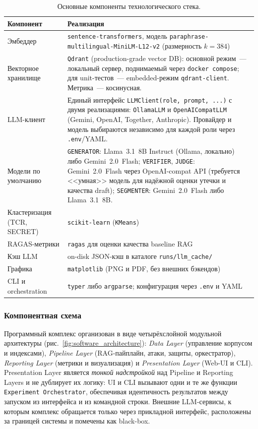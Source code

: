 \documentclass[12pt, a4paper]{article}
\theoremstyle{definition}
\theoremstyle{remark}
\begin{document}
\begin{table}[H]
\centering
\caption{Основные компоненты технологического стека.}
\label{tab:tech_stack}
\begin{tabular}{|p{}|p{}|}
\hline
\textbf{Компонент} & \textbf{Реализация} \\
\hline
Эмбеддер & \texttt{sentence-transformers}, модель \texttt{paraphrase-multilingual-MiniLM-L12-v2} (размерность $k = 384$) \\
\hline
Векторное хранилище & \texttt{Qdrant} (production-grade vector DB): основной режим~--- локальный сервер, поднимаемый через \texttt{docker compose}; для unit-тестов~--- embedded-режим \texttt{qdrant-client}. Метрика~--- косинусная. \\
\hline
LLM-клиент & Единый интерфейс \texttt{LLMClient(role, prompt, ...)} с двумя реализациями: \texttt{OllamaLLM} и \texttt{OpenAICompatLLM} (Gemini, OpenAI, Together, Anthropic). Провайдер и модель выбираются независимо для каждой роли через \texttt{.env}/YAML. \\
\hline
Модели по умолчанию & \texttt{GENERATOR}: Llama~3.1~8B Instruct (Ollama, локально) либо Gemini~2.0~Flash; \texttt{VERIFIER}, \texttt{JUDGE}: Gemini~2.0~Flash через OpenAI-compat API (требуется <<умная>> модель для надёжной оценки утечки и качества draft); \texttt{SEGMENTER}: Gemini~2.0~Flash либо Llama~3.1~8B. \\
\hline
Кластеризация (TCR, SECRET) & \texttt{scikit-learn} (\texttt{KMeans}) \\
\hline
RAGAS-метрики & \texttt{ragas} для оценки качества baseline RAG \\
\hline
Кэш LLM & on-disk JSON-кэш в каталоге \texttt{runs/llm\_cache/} \\
\hline
Графика & \texttt{matplotlib} (PNG и PDF, без внешних бэкендов) \\
\hline
CLI и orchestration & \texttt{typer} либо \texttt{argparse}; конфигурация через \texttt{.env} и YAML \\
\hline
\end{tabular}
\end{table}

\subsubsection{Компонентная схема}

Программный комплекс организован в виде четырёхслойной модульной архитектуры (рис.~\ref{fig:software_architecture}): \textit{Data Layer} (управление корпусом и индексами), \textit{Pipeline Layer} (RAG-пайплайн, атаки, защиты, оркестратор), \textit{Reporting Layer} (метрики и визуализация) и \textit{Presentation Layer} (Web-UI и CLI). Presentation Layer является \emph{тонкой надстройкой} над Pipeline и Reporting Layers и не дублирует их логику: UI и CLI вызывают одни и те же функции \texttt{Experiment Orchestrator}, обеспечивая идентичность результатов между запуском из интерфейса и из командной строки. Внешние LLM-сервисы, к которым комплекс обращается только через прикладной интерфейс, расположены за границей системы и помечены как black-box.
\end{document}
